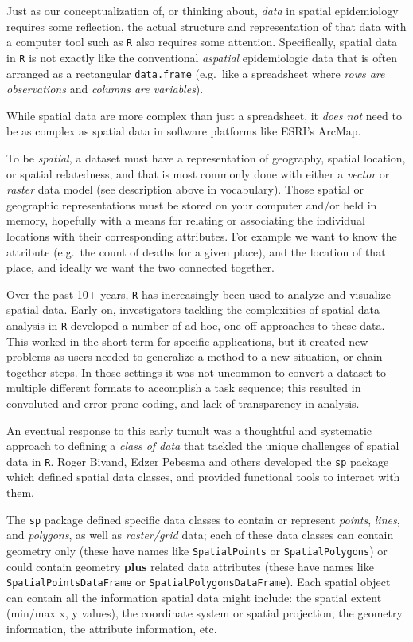 \documentclass[
]{book}
\begin{document}
Just as our conceptualization of, or thinking about, \emph{data} in spatial epidemiology requires some reflection, the actual structure and representation of that data with a computer tool such as \texttt{R} also requires some attention. Specifically, spatial data in \texttt{R} is not exactly like the conventional \emph{aspatial} epidemiologic data that is often arranged as a rectangular \texttt{data.frame} (e.g.~like a spreadsheet where \emph{rows are observations} and \emph{columns are variables}).

While spatial data are more complex than just a spreadsheet, it \emph{does not} need to be as complex as spatial data in software platforms like ESRI's ArcMap.

To be \emph{spatial}, a dataset must have a representation of geography, spatial location, or spatial relatedness, and that is most commonly done with either a \emph{vector} or \emph{raster} data model (see description above in vocabulary). Those spatial or geographic representations must be stored on your computer and/or held in memory, hopefully with a means for relating or associating the individual locations with their corresponding attributes. For example we want to know the attribute (e.g.~the count of deaths for a given place), and the location of that place, and ideally we want the two connected together.

Over the past 10+ years, \texttt{R} has increasingly been used to analyze and visualize spatial data. Early on, investigators tackling the complexities of spatial data analysis in \texttt{R} developed a number of ad hoc, one-off approaches to these data. This worked in the short term for specific applications, but it created new problems as users needed to generalize a method to a new situation, or chain together steps. In those settings it was not uncommon to convert a dataset to multiple different formats to accomplish a task sequence; this resulted in convoluted and error-prone coding, and lack of transparency in analysis.

An eventual response to this early tumult was a thoughtful and systematic approach to defining a \emph{class of data} that tackled the unique challenges of spatial data in \texttt{R}. Roger Bivand, Edzer Pebesma and others developed the \texttt{sp} package which defined spatial data classes, and provided functional tools to interact with them.

The \texttt{sp} package defined specific data classes to contain or represent \emph{points}, \emph{lines}, and \emph{polygons}, as well as \emph{raster/grid} data; each of these data classes can contain geometry only (these have names like \texttt{SpatialPoints} or \texttt{SpatialPolygons}) or could contain geometry \textbf{plus} related data attributes (these have names like \texttt{SpatialPointsDataFrame} or \texttt{SpatialPolygonsDataFrame}). Each spatial object can contain all the information spatial data might include: the spatial extent (min/max x, y values), the coordinate system or spatial projection, the geometry information, the attribute information, etc.
\end{document}
